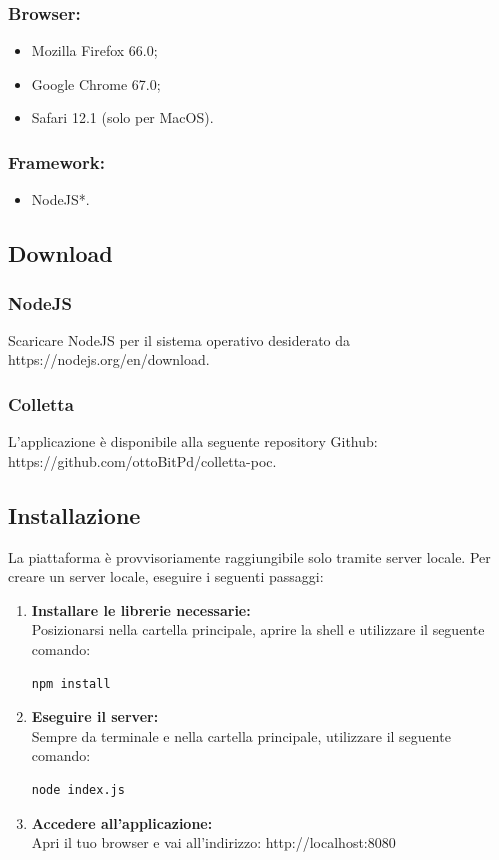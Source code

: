 \documentclass[11pt,a4paper]{article}
\begin{document}
{	\subsubsection{Browser:}
		\begin{itemize}
		\item Mozilla Firefox 66.0;
		\item Google Chrome 67.0;
		\item Safari 12.1 (solo per MacOS).		
	\end{itemize}
	\subsubsection{Framework:}
		\begin{itemize}
		\item NodeJS*.
		\end{itemize}
	

	\subsection{Download}
	\subsubsection{NodeJS}
	Scaricare NodeJS per il sistema operativo desiderato da https://nodejs.org/en/download.
	\subsubsection{Colletta}		
	L'applicazione è disponibile alla seguente repository Github:
	https://github.com/ottoBitPd/colletta-poc.
	
	\subsection{Installazione}
	La piattaforma è provvisoriamente raggiungibile solo tramite server locale.
	Per creare un server locale, eseguire i seguenti passaggi:
	 \begin{enumerate}
	 	\item \textbf{Installare le librerie necessarie:}\\ Posizionarsi nella cartella principale, aprire la shell e utilizzare il seguente comando:\begin{lstlisting}[numbers=none]
	 	npm install
	 	\end{lstlisting}
	 	\item \textbf{Eseguire il server:}\\ Sempre da terminale e nella cartella principale, utilizzare il seguente comando:\begin{lstlisting}[numbers=none]
	 	node index.js
	 	\end{lstlisting}
	 	\item \textbf{Accedere all'applicazione:}\\ Apri il tuo browser e vai all'indirizzo: http://localhost:8080
	 \end{enumerate}
 
}
\end{document}
